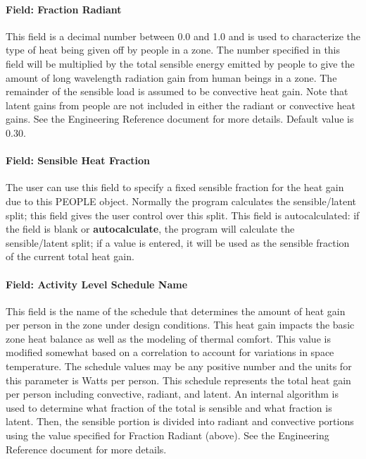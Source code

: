 \paragraph{Field: Fraction Radiant}\label{field-fraction-radiant}

This field is a decimal number between 0.0 and 1.0 and is used to characterize the type of heat being given off by people in a zone. The number specified in this field will be multiplied by the total sensible energy emitted by people to give the amount of long wavelength radiation gain from human beings in a zone. The remainder of the sensible load is assumed to be convective heat gain. Note that latent gains from people are not included in either the radiant or convective heat gains. See the Engineering Reference document for more details. Default value is 0.30.

\paragraph{Field: Sensible Heat Fraction}\label{field-sensible-heat-fraction}

The user can use this field to specify a fixed sensible fraction for the heat gain due to this PEOPLE object. Normally the program calculates the sensible/latent split; this field gives the user control over this split. This field is autocalculated: if the field is blank or \textbf{autocalculate}, the program will calculate the sensible/latent split; if a value is entered, it will be used as the sensible fraction of the current total heat gain.

\paragraph{Field: Activity Level Schedule Name}\label{field-activity-level-schedule-name}

This field is the name of the schedule that determines the amount of heat gain per person in the zone under design conditions. This heat gain impacts the basic zone heat balance as well as the modeling of thermal comfort. This value is modified somewhat based on a correlation to account for variations in space temperature. The schedule values may be any positive number and the units for this parameter is Watts per person. This schedule represents the total heat gain per person including convective, radiant, and latent. An internal algorithm is used to determine what fraction of the total is sensible and what fraction is latent. Then, the sensible portion is divided into radiant and convective portions using the value specified for Fraction Radiant (above). See the Engineering Reference document for more details.

